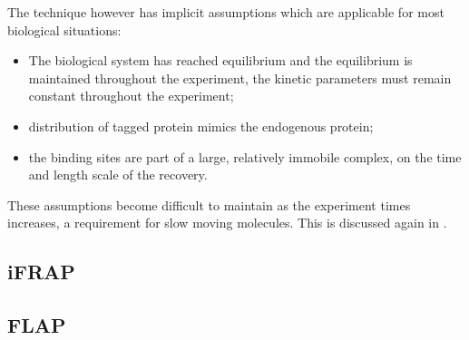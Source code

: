    The technique however has implicit assumptions which are applicable
    for most biological situations:

    \begin{itemize}
      \item The biological system has reached equilibrium and the equilibrium
        is maintained throughout the experiment, \ie{} the kinetic parameters
        must remain constant throughout the experiment;

      \item distribution of tagged protein mimics the endogenous protein;

      \item the binding sites are part of a large, relatively immobile
        complex, on the time and length scale of the recovery.
    \end{itemize}

    These assumptions become difficult to maintain as the experiment
    times increases, a requirement for slow moving molecules.  This
    is discussed again in .

  \subsection{iFRAP}


  \subsection{FLAP}


